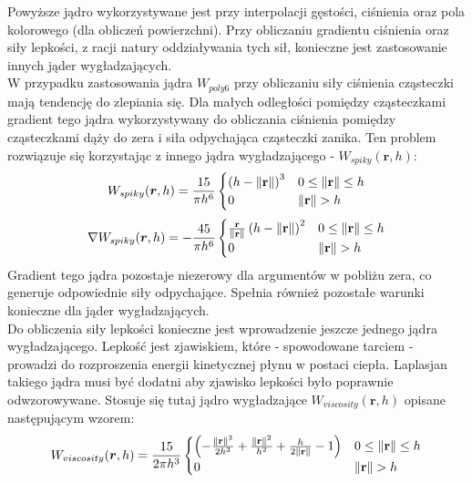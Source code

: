 Powyższe jądro wykorzystywane jest przy interpolacji gęstości, ciśnienia oraz pola kolorowego (dla obliczeń powierzchni). Przy obliczaniu gradientu ciśnienia oraz siły lepkości, z racji natury oddziaływania tych sił, konieczne jest zastosowanie innych jąder wygładzających.\\
\indent W przypadku zastosowania jądra $W_{poly6}$ przy obliczaniu siły ciśnienia cząsteczki mają tendencję do zlepiania się. Dla małych odległości pomiędzy cząsteczkami gradient tego jądra wykorzystywany do obliczania ciśnienia pomiędzy cząsteczkami dąży do zera i siła odpychająca cząsteczki zanika. Ten problem rozwiązuje się korzystając z innego jądra wygładzającego - $W_{spiky}(\boldsymbol{r}, h)$:
\begin{equation}
W_{spiky}(\boldsymbol{r}, h) = {15 \over \pi h^6}
\begin{cases}
\left(h - \| \mathbf{r} \|\right)^3 & 0 \le \| \mathbf{r} \| \le h \\
0 & \| \mathbf{r} \| > h
\end{cases}
\end{equation}
\begin{equation}
\nabla W_{spiky}(\boldsymbol{r}, h) = -{45 \over \pi h^6}
\begin{cases}
{\mathbf{r} \over {\| \mathbf{r} \|}} \left(h - \| \mathbf{r} \|\right)^2 & 0 \le \| \mathbf{r} \| \le h \\
0 & \| \mathbf{r} \| > h
\end{cases}
\end{equation}
Gradient tego jądra pozostaje niezerowy dla argumentów w pobliżu zera, co generuje odpowiednie siły odpychające. Spełnia również pozostałe warunki konieczne dla jąder wygładzających.\\
\indent Do obliczenia siły lepkości konieczne jest wprowadzenie jeszcze jednego jądra wygładzającego. Lepkość jest zjawiskiem, które - spowodowane tarciem - prowadzi do rozproszenia energii kinetycznej płynu w postaci ciepła. Laplasjan takiego jądra musi być dodatni aby zjawisko lepkości było poprawnie odwzorowywane. Stosuje się tutaj jądro wygładzające $W_{viscosity}(\boldsymbol{r}, h)$ opisane następującym wzorem:
\begin{equation}
W_{viscosity}(\boldsymbol{r}, h) = {15 \over 2 \pi h^3}
\begin{cases}
\left( -{ {\| \mathbf{r} \|}^3 \over 2 h^3 } + { {\| \mathbf{r} \|}^2 \over h^2 } + { h \over 2 {\| \mathbf{r} \|} } - 1 \right) & 0 \le \| \mathbf{r} \| \le h \\
0 & \| \mathbf{r} \| > h
\end{cases}
\end{equation}
